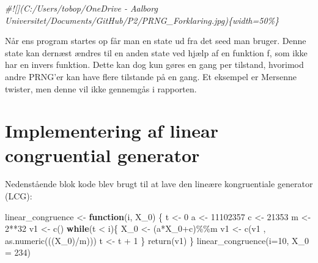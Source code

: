\documentclass[
]{article}
\newenvironment{Shaded}{\begin{snugshade}}{\end{snugshade}}
\newcommand{\AttributeTok}[1]{\textcolor[rgb]{0.77,0.63,0.00}{#1}}
\newcommand{\CommentTok}[1]{\textcolor[rgb]{0.56,0.35,0.01}{\textit{#1}}}
\newcommand{\ControlFlowTok}[1]{\textcolor[rgb]{0.13,0.29,0.53}{\textbf{#1}}}
\newcommand{\DecValTok}[1]{\textcolor[rgb]{0.00,0.00,0.81}{#1}}
\newcommand{\FunctionTok}[1]{\textcolor[rgb]{0.00,0.00,0.00}{#1}}
\newcommand{\NormalTok}[1]{#1}
\newcommand{\OtherTok}[1]{\textcolor[rgb]{0.56,0.35,0.01}{#1}}
\newcommand{\SpecialCharTok}[1]{\textcolor[rgb]{0.00,0.00,0.00}{#1}}
\begin{document}
\begin{Shaded}
\begin{Highlighting}[]
\CommentTok{\#![](C:/Users/tobop/OneDrive {-} Aalborg Universitet/Documents/GitHub/P2/PRNG\_Forklaring.jpg)\{width=50\%\}}
\end{Highlighting}
\end{Shaded}

Når ens program startes op får man en state ud fra det seed man bruger.
Denne state kan dernæst ændres til en anden state ved hjælp af en
funktion f, som ikke har en invers funktion. Dette kan dog kun gøres en
gang per tilstand, hvorimod andre PRNG'er kan have flere tilstande på en
gang. Et eksempel er Mersenne twister, men denne vil ikke gennemgås i
rapporten.

\hypertarget{implementering-af-linear-congruential-generator}{%
\section{Implementering af linear congruential
generator}\label{implementering-af-linear-congruential-generator}}

Nedenstående blok kode blev brugt til at lave den lineære kongruentiale
generator (LCG):

\begin{Shaded}
\begin{Highlighting}[]
\NormalTok{linear\_congruence }\OtherTok{\textless{}{-}} \ControlFlowTok{function}\NormalTok{(i, X\_0) \{}
\NormalTok{t }\OtherTok{\textless{}{-}} \DecValTok{0}
\NormalTok{a }\OtherTok{\textless{}{-}} \DecValTok{11102357}
\NormalTok{c }\OtherTok{\textless{}{-}} \DecValTok{21353}
\NormalTok{m }\OtherTok{\textless{}{-}} \DecValTok{2}\SpecialCharTok{**}\DecValTok{32}
\NormalTok{v1 }\OtherTok{\textless{}{-}} \FunctionTok{c}\NormalTok{()}
\ControlFlowTok{while}\NormalTok{(t }\SpecialCharTok{\textless{}}\NormalTok{ i)\{}
\NormalTok{  X\_0 }\OtherTok{\textless{}{-}}\NormalTok{ (a}\SpecialCharTok{*}\NormalTok{X\_0}\SpecialCharTok{+}\NormalTok{c)}\SpecialCharTok{\%\%}\NormalTok{m}
\NormalTok{  v1 }\OtherTok{\textless{}{-}} \FunctionTok{c}\NormalTok{(v1 , }\FunctionTok{as.numeric}\NormalTok{(((X\_0)}\SpecialCharTok{/}\NormalTok{m)))}
\NormalTok{  t }\OtherTok{\textless{}{-}}\NormalTok{ t }\SpecialCharTok{+} \DecValTok{1}
\NormalTok{\}}
\FunctionTok{return}\NormalTok{(v1)}
\NormalTok{\}}
\FunctionTok{linear\_congruence}\NormalTok{(}\AttributeTok{i=}\DecValTok{10}\NormalTok{, }\AttributeTok{X\_0 =} \DecValTok{234}\NormalTok{)}
\end{Highlighting}
\end{Shaded}
\end{document}
